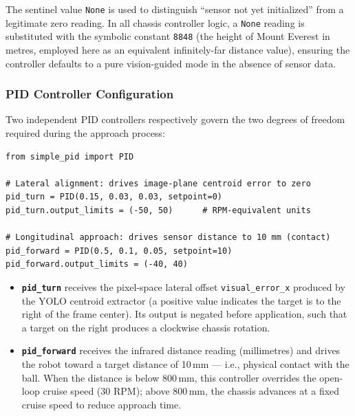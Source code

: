 The sentinel value \texttt{None} is used to distinguish ``sensor not yet initialized'' from a legitimate zero reading.
In all chassis controller logic, a \texttt{None} reading is substituted with the symbolic constant \texttt{8848}
(the height of Mount Everest in metres, employed here as an equivalent infinitely-far distance value),
ensuring the controller defaults to a pure vision-guided mode in the absence of sensor data.

\subsubsection{PID Controller Configuration}

Two independent PID controllers respectively govern the two degrees of freedom required during the approach process:

\begin{verbatim}
from simple_pid import PID

# Lateral alignment: drives image-plane centroid error to zero
pid_turn = PID(0.15, 0.03, 0.03, setpoint=0)
pid_turn.output_limits = (-50, 50)      # RPM-equivalent units

# Longitudinal approach: drives sensor distance to 10 mm (contact)
pid_forward = PID(0.5, 0.1, 0.05, setpoint=10)
pid_forward.output_limits = (-40, 40)
\end{verbatim}

\begin{itemize}
  \item \textbf{\texttt{pid\_turn}} receives the pixel-space lateral offset
        \texttt{visual\_error\_x} produced by the YOLO centroid extractor (a positive value indicates the target is to the right of the frame center). Its output is negated before application,
        such that a target on the right produces a clockwise chassis rotation.

  \item \textbf{\texttt{pid\_forward}} receives the infrared distance reading (millimetres) and drives the robot toward
        a target distance of 10\,mm — i.e., physical contact with the ball. When the distance is below 800\,mm, this controller
        overrides the open-loop cruise speed (30 RPM); above 800\,mm, the chassis advances at a fixed cruise speed
        to reduce approach time.
\end{itemize}

